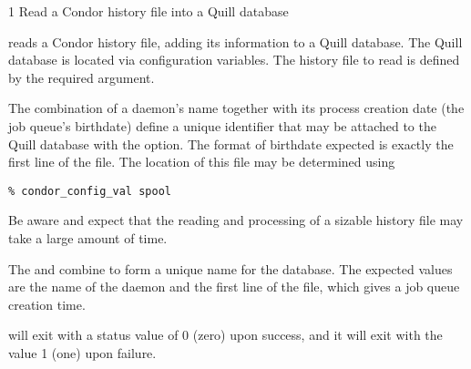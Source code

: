 \begin{ManPage}{\label{man-condor-load-history}}{1}
{Read a Condor history file into a Quill database}
\Synopsis {}


\Description
{} reads a Condor history file,
adding its information to a Quill database.
The Quill database is located via configuration variables.
The history file to read is defined by the required
 argument.

The combination of a  daemon's name together
with its process creation date
(the job queue's birthdate) define a unique identifier that
may be attached to the Quill database with the
 option.
The format of birthdate expected is exactly the first
line of the  file.
The location of this file may be determined using
\footnotesize
\begin{verbatim}
% condor_config_val spool
\end{verbatim}
\normalsize

Be aware and expect that the reading and processing of a sizable
history file may take a large amount of time.

\begin{Options}
    {The  and  combine to form
    a unique name for the database.  The expected values are the
    name of the  daemon and the first line
     of the  file, which gives a job queue
     creation time. }
\end{Options}


\ExitStatus

 will exit with a status value of 0 (zero) upon success,
and it will exit with the value 1 (one) upon failure.

\end{ManPage}
